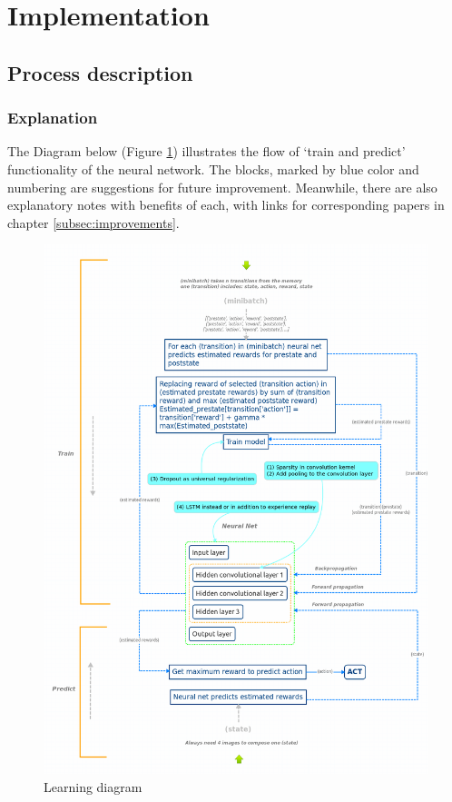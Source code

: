 \documentclass[a4paper,oneside,dvipsnames]{article}
\begin{document}
\newpage
\noindent
\section[Implementation]{Implementation}
\label{sec:implementation}

\subsection[Process description]{Process description}
\subsubsection[Explanation]{Explanation}

The Diagram below (Figure \ref{fig:nn_map}) illustrates the flow of ‘train and predict’ functionality of the neural
network. The blocks, marked by blue color and numbering are suggestions for future improvement. Meanwhile, there are also explanatory notes with benefits of each, with links for corresponding papers in chapter \ref{subsec:improvements}.

\begin{figure}[h]
    \centering
    \includegraphics[scale=0.3]{nn_map.png}
    \caption{Learning diagram}
    \label{fig:nn_map}
\end{figure}
\end{document}
